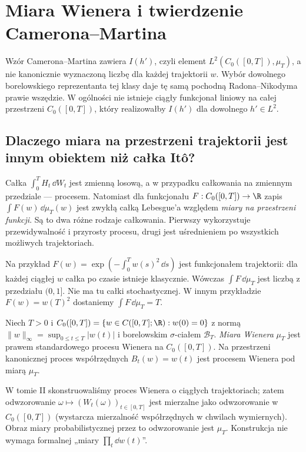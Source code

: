 \chapter{Miara Wienera i twierdzenie Camerona--Martina}
\label{ch:cameron-martin}

\begin{uwaga}
Wzór Camerona--Martina zawiera $I(h')$, czyli element
$L^2(C_0([0,T]),\mu_T)$, a nie kanonicznie wyznaczoną
liczbę dla każdej trajektorii $w$. Wybór dowolnego
borelowskiego reprezentanta tej klasy daje tę samą
pochodną Radona--Nikodyma prawie wszędzie. W ogólności
nie istnieje ciągły funkcjonał liniowy na całej
przestrzeni $C_0([0,T])$, który realizowałby $I(h')$
dla dowolnego $h'\in L^2$.
\end{uwaga}

\section{Dlaczego miara na przestrzeni trajektorii jest innym obiektem niż całka Itô?}

Całka $\int_0^T H_t\,\dd W_t$ jest zmienną losową, a w przypadku
całkowania na zmiennym przedziale --- procesem. Natomiast dla funkcjonału
$F:C_0([0,T])\to\R$ zapis $\int F(w)\,\dd\mu_T(w)$ jest zwykłą całką
Lebesgue'a względem \emph{miary na przestrzeni funkcji}. Są to dwa
różne rodzaje całkowania. Pierwszy wykorzystuje przewidywalność i przyrosty
procesu, drugi jest uśrednieniem po wszystkich możliwych trajektoriach.

Na przykład $F(w)=\exp(-\int_0^T w(s)^2\,\dd s)$ jest funkcjonałem
trajektorii: dla każdej ciągłej $w$ całka po czasie istnieje klasycznie.
Wówczas $\int F\,\dd\mu_T$ jest liczbą z przedziału $(0,1]$.
Nie ma tu całki stochastycznej. W innym przykładzie
$F(w)=w(T)^2$ dostaniemy $\int F\,\dd\mu_T=T$.

\begin{definicja}
\label{def:canonical-wiener}
Niech $T>0$ i
$C_0([0,T])=\{w\in C([0,T];\R):w(0)=0\}$ z normą
$\|w\|_\infty=\sup_{0\le t\le T}|w(t)|$ i
borelowskim $\sigma$-ciałem $\mathcal B_T$.
\emph{Miara Wienera} $\mu_T$ jest prawem standardowego procesu Wienera
na $C_0([0,T])$. Na przestrzeni kanonicznej proces współrzędnych
$B_t(w)=w(t)$ jest procesem Wienera pod miarą $\mu_T$.
\end{definicja}

W tomie II skonstruowaliśmy proces Wienera o ciągłych trajektoriach;
zatem odwzorowanie $\omega\mapsto(W_t(\omega))_{t\in[0,T]}$ jest
mierzalne jako odwzorowanie w $C_0([0,T])$ (wystarcza mierzalność
współrzędnych w chwilach wymiernych). Obraz miary probabilistycznej
przez to odwzorowanie jest $\mu_T$. Konstrukcja nie wymaga formalnej
„miary $\prod_t\dd w(t)$”.


